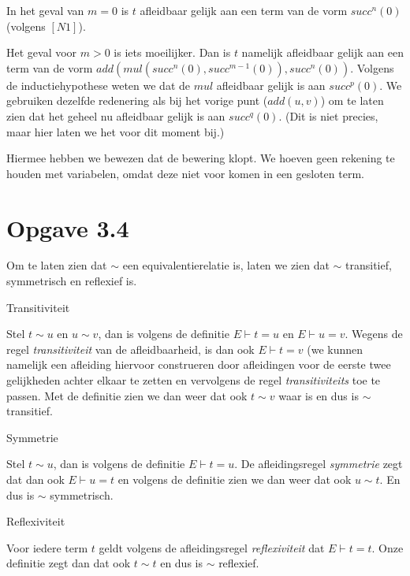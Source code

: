 \documentclass[a4paper,11pt]{article}
\begin{document}
\begin{description}
\begin{description}
    In het geval van $m=0$ is $t$ afleidbaar gelijk aan een term van de vorm
    $succ^{n}(0)$ (volgens $[N1]$).

    Het geval voor $m>0$ is iets moeilijker. Dan is $t$ namelijk afleidbaar
    gelijk aan een term van de vorm $add(mul(succ^{n}(0), succ^{m-1}(0)),
    succ^{n}(0))$. Volgens de inductiehypothese weten we dat de $mul$
    afleidbaar gelijk is aan $succ^{p}(0)$. We gebruiken dezelfde redenering
    als bij het vorige punt ($add(u, v)$) om te laten zien dat het geheel nu
    afleidbaar gelijk is aan $succ^{q}(0)$. (Dit is niet precies, maar hier
    laten we het voor dit moment bij.)

  \end{description}

\end{description}

Hiermee hebben we bewezen dat de bewering klopt. We hoeven geen rekening te
houden met variabelen, omdat deze niet voor komen in een gesloten term.


\section*{Opgave 3.4}

Om te laten zien dat $\sim$ een equivalentierelatie is, laten we zien dat $\sim$
transitief, symmetrisch en reflexief is.

\begin{description}

\item{Transitiviteit}

  Stel $t \sim u$ en $u \sim v$, dan is volgens de definitie $E \vdash t = u$ en
  $E \vdash u = v$. Wegens de regel \emph{transitiviteit} van de
  afleidbaarheid, is dan ook $E \vdash t = v$ (we kunnen namelijk een afleiding
  hiervoor construeren door afleidingen voor de eerste twee gelijkheden achter
  elkaar te zetten en vervolgens de regel \emph{transitiviteits} toe te passen.
  Met de definitie zien we dan weer dat ook $t \sim v$ waar is en dus is $\sim$
  transitief.

\item{Symmetrie}

  Stel $t \sim u$, dan is volgens de definitie $E \vdash t = u$. De
  afleidingsregel \emph{symmetrie} zegt dat dan ook $E \vdash u = t$ en
  volgens de definitie zien we dan weer dat ook $u \sim t$. En dus is $\sim$
  symmetrisch.

\item{Reflexiviteit}

  Voor iedere term $t$ geldt volgens de afleidingsregel \emph{reflexiviteit}
  dat $E \vdash t = t$. Onze definitie zegt dan dat ook $t \sim t$ en dus is
  $\sim$ reflexief.

\end{description}
\end{document}
